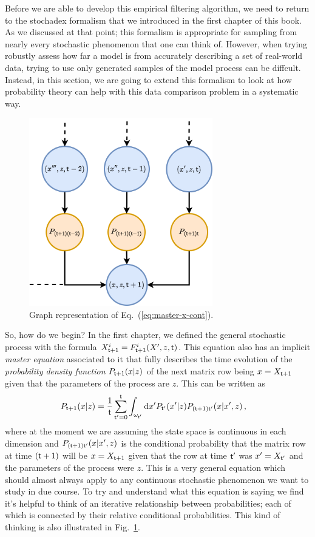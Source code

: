 Before we are able to develop this empirical filtering algorithm, we need to return to the stochadex formalism that we introduced in the first chapter of this book. As we discussed at that point; this formalism is appropriate for sampling from nearly every stochastic phenomenon that one can think of. However, when trying robustly assess how far a model is from accurately describing a set of real-world data, trying to use only generated samples of the model process can be diffcult. Instead, in this section, we are going to extend this formalism to look at how probability theory can help with this data comparison problem in a systematic way.

\begin{figure}[h]
\centering
\includegraphics[width=8cm]{images/chapter-4-master-eq-graph.drawio.png}
\caption{Graph representation of Eq.~(\ref{eq:master-x-cont}).}
\label{fig:master-eqn}
\end{figure} 

So, how do we begin? In the first chapter, we defined the general stochastic process with the formula $X^{i}_{{\sf t}+1} = F^{i}_{{\sf t}+1}(X',z,{\sf t})$. This equation also has an implicit \emph{master equation} associated to it that fully describes the time evolution of the \emph{probability density function} $P_{{\sf t}+1}(x\vert z)$ of the next matrix row being $x=X_{{\sf t}+1}$ given that the parameters of the process are $z$. This can be written as
\begin{align}
P_{{\sf t}+1}(x\vert z) &= \frac{1}{{\sf t}}\sum_{{\sf t}'=0}^{{\sf t}}\int_{\omega_{{\sf t}'}}{\rm d}x' P_{{\sf t}'}(x'\vert z) P_{({\sf t}+1){\sf t}'}(x\vert x',z) \label{eq:master-x-cont} \,,
\end{align}
where at the moment we are assuming the state space is continuous in each dimension and $P_{({\sf t}+1){\sf t}'}(x\vert x',z)$ is the conditional probability that the matrix row at time $({\sf t}+1)$ will be $x=X_{{\sf t}+1}$ given that the row at time ${\sf t}'$ was $x'=X_{{\sf t}'}$ and the parameters of the process were $z$. This is a very general equation which should almost always apply to any continuous stochastic phenomenon we want to study in due course. To try and understand what this equation is saying we find it's helpful to think of an iterative relationship between probabilities; each of which is connected by their relative conditional probabilities. This kind of thinking is also illustrated in Fig.~\ref{fig:master-eqn}.

